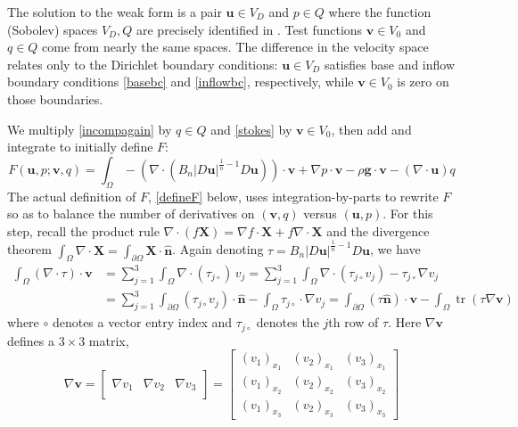 \documentclass[letterpaper,final,12pt,reqno]{amsart}
\newcommand{\grad}{\nabla}
\newcommand{\trace}{\operatorname{tr}}
\newcommand{\hbn}{\hat{\mathbf{n}}}
\newcommand{\bu}{\mathbf{u}}
\newcommand{\bv}{\mathbf{v}}
\newcommand{\bX}{\mathbf{X}}
\begin{document}
The solution to the weak form is a pair $\bu\in V_D$ and $p \in Q$ where the function (Sobolev) spaces $V_D,Q$ are precisely identified in \cite{JouvetRappaz2011}.  Test functions $\bv\in V_0$ and $q\in Q$ come from nearly the same spaces.  The difference in the velocity space relates only to the Dirichlet boundary conditions: $\bu\in V_D$ satisfies base and inflow boundary conditions \eqref{basebc} and \eqref{inflowbc}, respectively, while $\bv\in V_0$ is zero on those boundaries.

We multiply \eqref{incompagain} by $q\in Q$ and \eqref{stokes} by $\bv\in V_0$, then add and integrate to initially define $F$:
\begin{equation}
F(\bu,p;\bv,q) = \int_\Omega - \left(\nabla \cdot \left(B_n |D\bu|^{\frac{1}{n} - 1} D\bu\right)\right)\cdot \bv + \nabla p \cdot \bv - \rho \mathbf{g} \cdot \bv - \left(\nabla \cdot \bu\right) q \label{nonfuncone}
\end{equation}
The actual definition of $F$, \eqref{defineF} below, uses integration-by-parts to rewrite $F$ so as to balance the number of derivatives on $(\bv,q)$ versus $(\bu,p)$.  For this step, recall the product rule $\nabla \cdot(f\bX) = \grad f\cdot \bX + f \nabla \cdot \bX$ and the divergence theorem $\int_\Omega \nabla \cdot \bX = \int_{\partial \Omega} \bX \cdot \hbn$.  Again denoting $\tau = B_n |D\bu|^{\frac{1}{n} - 1} D\bu$, we have
\begin{align*}
\int_\Omega \left(\nabla \cdot \tau\right)\cdot \bv &= \sum_{j=1}^3 \int_\Omega \nabla \cdot (\tau_{j\circ})\, v_j = \sum_{j=1}^3 \int_\Omega \nabla \cdot (\tau_{j\circ} v_j) - \tau_{j\circ} \nabla v_j \\
  &= \sum_{j=1}^3 \int_{\partial \Omega} (\tau_{j\circ} v_j) \cdot \hbn - \int_\Omega \tau_{j\circ} \cdot \nabla v_j = \int_{\partial \Omega} (\tau \hbn)\cdot \bv - \int_\Omega \trace(\tau \nabla \bv)
\end{align*}
where $\circ$ denotes a vector entry index and $\tau_{j\circ}$ denotes the $j$th row of $\tau$.  Here $\grad\bv$ defines a $3\times 3$ matrix,
\newcommand{\trefthree}[3]{\left[\begin{array}{c|c|c} & & \\ #1 & #2 & #3 \\ & & \end{array}\right]}
    $$\grad \bv = \trefthree{\grad v_1}{\grad v_2}{\grad v_3} = \begin{bmatrix}
    (v_1)_{x_1} & (v_2)_{x_1} & (v_3)_{x_1} \\
    (v_1)_{x_2} & (v_2)_{x_2} & (v_3)_{x_2} \\
    (v_1)_{x_3} & (v_2)_{x_3} & (v_3)_{x_3}
    \end{bmatrix}$$
\end{document}

